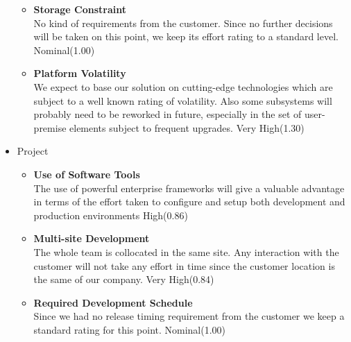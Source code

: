 \begin{itemize}
\begin{itemize}
        \item \textbf{Storage Constraint}\\
        No kind of requirements from the customer. Since no further decisions will be taken on this point, we keep its effort rating to a standard level.
        \hfill Nominal(1.00)
        
        \item \textbf{Platform Volatility}\\
        We expect to base our solution on cutting-edge technologies which are subject to a well known rating of volatility. Also some subsystems will probably need to be reworked in future, especially in the set of user-premise elements subject to frequent upgrades.
        \hfill  Very High(1.30)
    \end{itemize}
    
    \item Project
    \begin{itemize}
        \item \textbf{Use of Software Tools}\\
        The use of powerful enterprise frameworks will give a valuable advantage in terms of the effort taken to configure and setup both development and production environments
        \hfill High(0.86)
        
        \item \textbf{Multi-site Development}\\
        The whole team is collocated in the same site. Any interaction with the customer will not take any effort in time since the customer location is the same of our company.
        \hfill Very High(0.84)
        
        \item \textbf{Required Development Schedule}\\
        Since we had no release timing requirement from the customer we keep a standard rating for this point.
        \hfill Nominal(1.00)
    \end{itemize}
\end{itemize}

